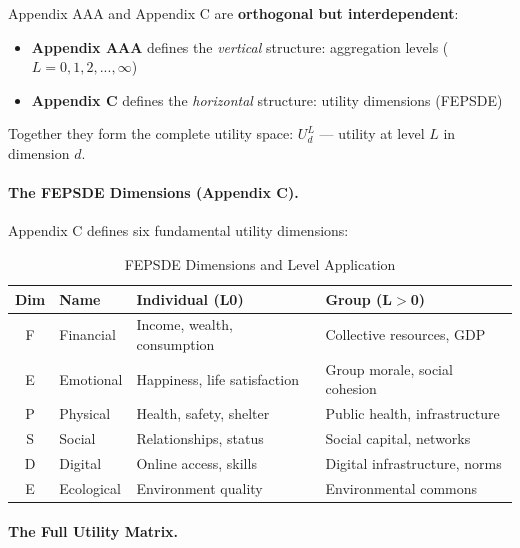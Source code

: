 \begin{tcolorbox}[colback=blue!5!white, colframe=blue!75!black, title=The AAA-C Connection: Levels $\times$ Dimensions]
Appendix AAA and Appendix C are \textbf{orthogonal but interdependent}:
\begin{itemize}[nosep]
\item \textbf{Appendix AAA} defines the \textit{vertical} structure: aggregation levels ($L = 0, 1, 2, ..., \infty$)
\item \textbf{Appendix C} defines the \textit{horizontal} structure: utility dimensions (FEPSDE)
\end{itemize}

Together they form the complete utility space: $U^L_d$ --- utility at level $L$ in dimension $d$.
\end{tcolorbox}

\paragraph{The FEPSDE Dimensions (Appendix C).}

Appendix C defines six fundamental utility dimensions:

\begin{table}[htbp]
\centering
\caption{FEPSDE Dimensions and Level Application}
\label{tab:aaa-fepsde-levels}
\renewcommand{\arraystretch}{1.3}
\begin{tabular}{@{}clp{5cm}p{4cm}@{}}
\toprule
\textbf{Dim} & \textbf{Name} & \textbf{Individual (L0)} & \textbf{Group (L$>$0)} \\
\midrule
F & Financial & Income, wealth, consumption & Collective resources, GDP \\
E & Emotional & Happiness, life satisfaction & Group morale, social cohesion \\
P & Physical & Health, safety, shelter & Public health, infrastructure \\
S & Social & Relationships, status & Social capital, networks \\
D & Digital & Online access, skills & Digital infrastructure, norms \\
E & Ecological & Environment quality & Environmental commons \\
\bottomrule
\end{tabular}
\end{table}

\paragraph{The Full Utility Matrix.}

